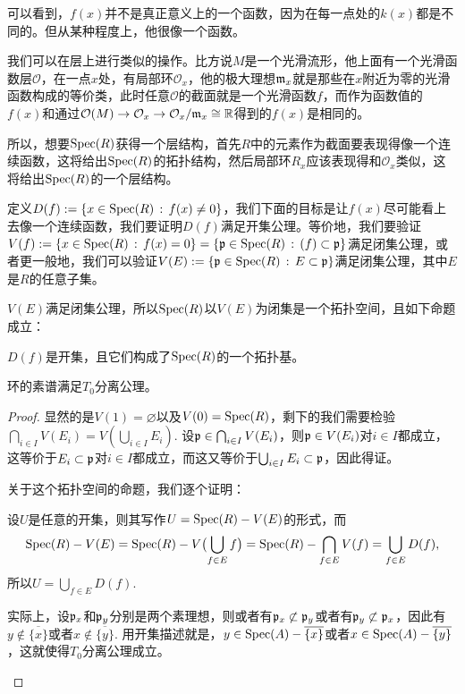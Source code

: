 可以看到，$f(x)$并不是真正意义上的一个函数，因为在每一点处的$k(x)$都是不同的。但从某种程度上，他很像一个函数。

我们可以在层上进行类似的操作。比方说$M$是一个光滑流形，他上面有一个光滑函数层$\mathcal{O}$，在一点$x$处，有局部环$\mathcal{O}_x$，他的极大理想$\mathfrak{m}_x$就是那些在$x$附近为零的光滑函数构成的等价类，此时任意$\mathcal{O}$的截面就是一个光滑函数$f$，而作为函数值的$f(x)$和通过$\mathcal{O}(M)\to \mathcal{O}_x\to \mathcal{O}_x/\mathfrak{m}_x\cong \mathbb{R}$得到的$f(x)$是相同的。

所以，想要$\operatorname{Spec}(R)$获得一个层结构，首先$R$中的元素作为截面要表现得像一个连续函数，这将给出$\operatorname{Spec}(R)$的拓扑结构，然后局部环$R_x$应该表现得和$\mathcal{O}_x$类似，这将给出$\operatorname{Spec}(R)$的一个层结构。

\begin{para}[素谱的拓扑结构]
定义$D(f):=\{x\in \operatorname{Spec}(R)\,:\, f(x)\neq 0\}$，我们下面的目标是让$f(x)$尽可能看上去像一个连续函数，我们要证明$D(f)$满足开集公理。等价地，我们要验证$V(f):=\{x\in \operatorname{Spec}(R)\,:\, f(x)=0\}=\{\mathfrak{p}\in \operatorname{Spec}(R)\,:\, (f)\subset \mathfrak{p}\}$满足闭集公理，或者更一般地，我们可以验证$V(E):=\{\mathfrak{p}\in \operatorname{Spec}(R)\,:\, E\subset \mathfrak{p}\}$满足闭集公理，其中$E$是$R$的任意子集。
\end{para}

\begin{pro}\label{pro:3.4}
$V(E)$满足闭集公理，所以$\operatorname{Spec}(R)$以$V(E)$为闭集是一个拓扑空间，且如下命题成立：
\begin{compactenum}[~~~1.]
\item $D(f)$是开集，且它们构成了$\operatorname{Spec}(R)$的一个拓扑基。
\item 环的素谱满足$T_0$分离公理。
\end{compactenum}
\end{pro}

\begin{proof}
显然的是$V(1)=\varnothing$以及$V(0)=\operatorname{Spec}(R)$，剩下的我们需要检验$\bigcap_{i\in I}V(E_i)=V(\bigcup_{i\in I}E_i)$. 设$\mathfrak{p} \in \bigcap_{i\in I}V(E_i)$，则$\mathfrak{p}\in V(E_i)$对$i\in I$都成立，这等价于$E_i\subset \mathfrak{p}$对$i\in I$都成立，而这又等价于$\bigcup_{i\in I}E_i \subset \mathfrak{p}$，因此得证。

关于这个拓扑空间的命题，我们逐个证明：
\begin{compactenum}[~~~1.]
\item 设$U$是任意的开集，则其写作$U=\operatorname{Spec}(R)-V(E)$的形式，而
\[
\operatorname{Spec}(R)-V(E)=\operatorname{Spec}(R)-V\bigl(\bigcup_{f\in E} f\bigr)=\operatorname{Spec}(R)-\bigcap_{f\in E}V(f)=\bigcup_{f\in E}D(f),
\]
所以$U=\bigcup_{f\in E}D(f)$.
\item 实际上，设$\mathfrak{p}_x$和$\mathfrak{p}_y$分别是两个素理想，则或者有$\mathfrak{p}_x\not\subset \mathfrak{p}_y$或者有$\mathfrak{p}_y\not\subset \mathfrak{p}_x$，因此有$y\not\in \overline{\{x\}}$或者$x\not\in \overline{\{y\}}$. 用开集描述就是，$y\in \operatorname{Spec}(A)-\overline{\{x\}}$或者$x\in \operatorname{Spec}(A)-\overline{\{y\}}$，这就使得$T_0$分离公理成立。
\end{compactenum}
\end{proof}

